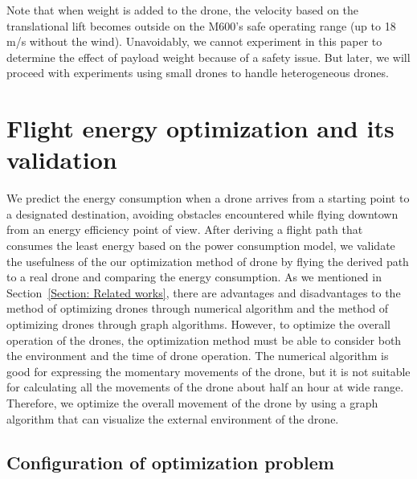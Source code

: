 \documentclass[journal]{./template/IEEEtran}
\begin{document}
Note that when weight is added to the drone, the velocity based on the translational lift becomes outside on the M600's safe operating range (up to 18 m/s without the wind). Unavoidably, we cannot experiment in this paper to determine the effect of payload weight because of a safety issue. But later, we will proceed with experiments using small drones to handle heterogeneous drones.










\section{Flight energy optimization and its validation}

We predict the energy consumption when a drone arrives from a starting point to a designated destination, avoiding obstacles encountered while flying downtown from an energy efficiency point of view. After deriving a flight path that consumes the least energy based on the power consumption model, we validate the usefulness of the our optimization method of drone by flying the derived path to a real drone and comparing the energy consumption.
As we mentioned in Section~\ref{Section: Related works}, there are advantages and disadvantages to the method of optimizing drones through numerical algorithm and the method of optimizing drones through graph algorithms.
However, to optimize the overall operation of the drones, the optimization method must be able to consider both the environment and the time of drone operation. 
The numerical algorithm is good for expressing the momentary movements of the drone, but it is not suitable for calculating all the movements of the drone about half an hour at wide range.
Therefore, we optimize the overall movement of the drone by using a graph algorithm that can visualize the external environment of the drone.





\subsection{Configuration of optimization problem}
\end{document}
